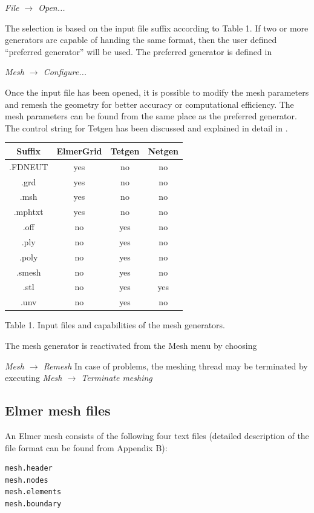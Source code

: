 \documentclass[a4paper,12pt]{article}
\newcommand{\menu}[2]{{\it \vskip2mm #1 $\rightarrow$ #2 \vskip2mm}}
\begin{document}
\menu{File}{Open...}

The selection is based on the input file suffix according to Table 1. If two or more
generators are capable of handing the same format, then the user defined ``preferred
generator'' will be used. The preferred generator is defined in

\menu{Mesh}{Configure...}

Once the input file has been opened, it is possible to modify the mesh parameters
and remesh the geometry for better accuracy or computational efficiency. The mesh parameters
can be found from the same place as the preferred generator. The control string for Tetgen
has been discussed and explained in detail in \cite{TetgenHome}.

\begin{center}
\begin{tabular}{|c|c|c|c|}
\hline
 Suffix & ElmerGrid & Tetgen & Netgen \\
\hline 
.FDNEUT & yes & no & no \\
.grd  & yes & no & no \\
.msh & yes & no & no \\
.mphtxt & yes & no & no \\
.off & no & yes & no \\
.ply & no & yes & no \\
.poly & no & yes & no \\
.smesh & no & yes & no \\
.stl  & no & yes & yes \\
.unv & no & yes & no \\
\hline
\end{tabular}
\vskip5mm
Table 1. Input files and capabilities of the mesh generators.
\end{center}

The mesh generator is reactivated from the Mesh menu by choosing

\menu{Mesh}{Remesh}
\noindent In case of problems, the meshing thread may be terminated by executing 
\menu{Mesh}{Terminate meshing}

\subsection{Elmer mesh files}

An Elmer mesh consists of the following four text files (detailed description of the file format can be found from Appendix B):

\begin{footnotesize}
\begin{verbatim}
mesh.header 
mesh.nodes 
mesh.elements 
mesh.boundary 
\end{verbatim}
\end{footnotesize}
\end{document}
